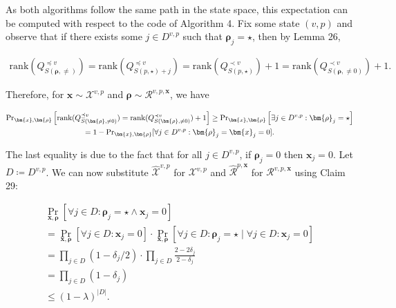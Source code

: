 As both algorithms follow the same path in the state space, this expectation can be computed with respect to the code of Algorithm 4. Fix some state $(v,p)$ and observe that if there exists some $j\in D^{v,p}$ such that $\bm{\rho}_{j}=\star$, then by Lemma 26,\par


\[\begin{gathered}
\mathrm{rank}(Q^{\preceq v}_{S({\bm{\rho}},\neq)})=\mathrm{rank}(Q^{\preceq v}_{S(p,\star)+j})=\mathrm{rank}(Q^{\prec v}_{S(p,\star)})+1=\mathrm{rank}(Q^{\prec v}_{S(\bm{\rho},\neq 0)})+1.
\end{gathered}\]


Therefore, for $\bm{x}\sim\mathcal{X}^{v,p}$ and $\bm{\rho}\sim\mathcal{R}^{v,p,\bm{x}}$, we have\par


\[\begin{gathered}
\displaystyle\Pr\nolimits_{\bm{x},\bm{\rho}}\Big{[}\mathrm{rank}(Q^{\preceq v}_{S(\bm{\rho},\neq 0)})=\mathrm{rank}(Q^{\prec v}_{S(\bm{\rho},\neq 0)})+1\Big{]} \displaystyle\geq\Pr\nolimits_{\bm{x},\bm{\rho}}\left[\exists j\in D^{v,p}:\bm{\rho}_{j}=\star\right] \\
\displaystyle=1-\Pr\nolimits_{\bm{x},\bm{\rho}}[\forall j\in D^{v,p}:\bm{\rho}_{j}=\bm{x}_{j}=0].
\end{gathered}\]


The last equality is due to the fact that for all $j\in D^{v,p}$, if $\bm{\rho}_{j}=0$ then $\bm{x}_{j}=0$. Let $D\coloneqq D^{v,p}$. We can now substitute $\widehat{\mathcal{X}}^{v,p}$ for $\mathcal{X}^{v,p}$ and $\widehat{\mathcal{R}}^{p,\bm{x}}$ for $\mathcal{R}^{v,p,\bm{x}}$ using Claim 29:\par


\[\begin{gathered}
\displaystyle\Pr_{\bm{x},\bm{\rho}}[\forall j\in D\colon\bm{\rho}_{j}=\star\land\bm{x}_{j}=0] \\
\displaystyle= \displaystyle\Pr_{\bm{x},\bm{\rho}}[\forall j\in D\colon\bm{x}_{j}=0]\cdot\Pr_{\bm{x},\bm{\rho}}[\forall j\in D\colon\bm{\rho}_{j}=\star\mid\forall j\in D\colon\bm{x}_{j}=0] \\
\displaystyle= \displaystyle\prod\nolimits_{j\in D}(1-\delta_{j}/2)\cdot\prod\nolimits_{j\in D}\frac{2-2\delta_{j}}{2-\delta_{j}} \\
\displaystyle= \displaystyle\prod\nolimits_{j\in D}(1-\delta_{j}) \\
\displaystyle\leq \displaystyle(1-\lambda)^{|D|}.
\end{gathered}\]


